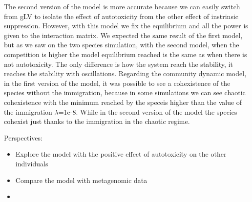 \documentclass[11pt,a4paper,fleqn]{article}
\begin{document}
\indent The second version of the model is more accurate because we can easily switch from gLV to isolate the effect of autotoxicity from the other effect of instrinsic suppression. However, with this model we fix the equilibrium and all the power is given to the interaction matrix. We expected the same result of the first model, but as we saw on the two species simulation, with the second model, when the competition is higher the model equilibrium reached is the same as when there is not autotoxicity. The only difference is how the system reach the stability, it reaches the stability with oscillations. 
\indent Regarding the community dynamic model, in the first version of the model, it was possible to see a cohexistence of the species without the immigration, because in some simulations we can see chaotic cohexistence with the minimum reached by the speceis higher than the value of the immigration $\lambda$=1e-8. While in the second version of the model the species cohexist just thanks to the immigration in the chaotic regime. 

\indent Perspectives:
\begin{itemize}
	\item Explore the model with the positive effect of autotoxicity on the other individuals
	\item Compare the model with metagenomic data 
	\item 
\end{itemize}

\printbibliography %
\end{document}
